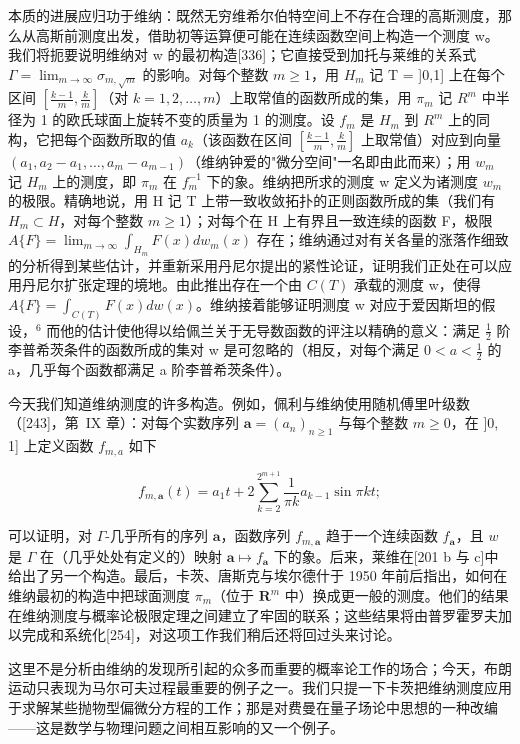 本质的进展应归功于维纳：既然无穷维希尔伯特空间上不存在合理的高斯测度，那么从高斯前测度出发，借助初等运算便可能在连续函数空间上构造一个测度 w。我们将扼要说明维纳对 w 的最初构造{[}336{]}；它直接受到加托与莱维的关系式 \(\Gamma = \lim_{m \to \infty} \sigma_{m, \sqrt{m}}\) 的影响。对每个整数 \(m \geq 1\)，用 \(H_m\) 记 T = ]0,1] 上在每个区间 \(\left[\frac{k-1}{m}, \frac{k}{m}\right]\)（对 \(k = 1, 2, \ldots, m\)）上取常值的函数所成的集，用 \(\pi_m\) 记 \(R^m\) 中半径为 1 的欧氏球面上旋转不变的质量为 1 的测度。设 \(f_m\) 是 \(H_m\) 到 \(R^m\) 上的同构，它把每个函数所取的值 \(a_k\)（该函数在区间 \(\left[\frac{k-1}{m}, \frac{k}{m}\right]\) 上取常值）对应到向量 \((a_1, a_2 - a_1, \ldots, a_m - a_{m-1})\)（维纳钟爱的"微分空间"一名即由此而来）；用 \(w_m\) 记 \(H_m\) 上的测度，即 \(\pi_m\) 在 \(f_m^{-1}\) 下的象。维纳把所求的测度 w 定义为诸测度 \(w_m\) 的极限。精确地说，用 H 记 T 上带一致收敛拓扑的正则函数所成的集（我们有 \(H_m \subset H\)，对每个整数 \(m \geq 1\)）；对每个在 H 上有界且一致连续的函数 F，极限 \(A\{F\} = \lim_{m \to \infty} \int_{H_m} F(x) dw_m(x)\) 存在；维纳通过对有关各量的涨落作细致的分析得到某些估计，并重新采用丹尼尔提出的紧性论证，证明我们正处在可以应用丹尼尔扩张定理的境地。由此推出存在一个由 \(C(T)\) 承载的测度 w，使得 \(A\{F\} = \int_{C(T)} F(x) dw(x)\)。维纳接着能够证明测度 w 对应于爱因斯坦的假设，\(^{6}\) 而他的估计使他得以给佩兰关于无导数函数的评注以精确的意义：满足 \(\frac{1}{2}\) 阶李普希茨条件的函数所成的集对 w 是可忽略的（相反，对每个满足 \(0 < a < \frac{1}{2}\) 的 a，几乎每个函数都满足 a 阶李普希茨条件）。

今天我们知道维纳测度的许多构造。例如，佩利与维纳使用随机傅里叶级数（{[}243{]}，第~IX 章）：对每个实数序列 \(\mathbf{a} = (a_{n})_{n \geq 1}\) 与每个整数 \(m \geq 0\)，在 ]0, 1] 上定义函数 \(f_{m,a}\) 如下

\[
f _ {m, \mathbf {a}} (t) = a _ {1} t + 2 \sum_ {k = 2} ^ {2 ^ {m + 1}} \frac {1}{\pi k} a _ {k - 1} \sin \pi k t;
\]

可以证明，对 \(\Gamma\)-几乎所有的序列 \(\mathbf{a}\)，函数序列 \(f_{m,\mathbf{a}}\) 趋于一个连续函数 \(f_{\mathbf{a}}\)，且 \(w\) 是 \(\Gamma\) 在（几乎处处有定义的）映射 \(\mathbf{a} \mapsto f_{\mathbf{a}}\) 下的象。后来，莱维在{[}201 b 与 c{]}中给出了另一个构造。最后，卡茨、唐斯克与埃尔德什于 1950 年前后指出，如何在维纳最初的构造中把球面测度 \(\pi_m\)（位于 \(\mathbf{R}^m\) 中）换成更一般的测度。他们的结果在维纳测度与概率论极限定理之间建立了牢固的联系；这些结果将由普罗霍罗夫加以完成和系统化{[}254{]}，对这项工作我们稍后还将回过头来讨论。

这里不是分析由维纳的发现所引起的众多而重要的概率论工作的场合；今天，布朗运动只表现为马尔可夫过程最重要的例子之一。我们只提一下卡茨把维纳测度应用于求解某些抛物型偏微分方程的工作；那是对费曼在量子场论中思想的一种改编——这是数学与物理问题之间相互影响的又一个例子。

